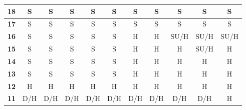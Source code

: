\documentclass[conference]{IEEEtran}
\begin{document}
\begin{table}[htbp]
\begin{tabular}{|c|c|c|c|c|c|c|c|c|c|c|}
\textbf{18} & \cellcolor[HTML]{32CB00}S & \cellcolor[HTML]{32CB00}S & \cellcolor[HTML]{32CB00}S & \cellcolor[HTML]{32CB00}S & \cellcolor[HTML]{32CB00}S & \cellcolor[HTML]{32CB00}S & \cellcolor[HTML]{32CB00}S & \cellcolor[HTML]{32CB00}S & \cellcolor[HTML]{32CB00}S & \cellcolor[HTML]{32CB00}S \\ \hline
\textbf{17} & \cellcolor[HTML]{32CB00}S & \cellcolor[HTML]{32CB00}S & \cellcolor[HTML]{32CB00}S & \cellcolor[HTML]{32CB00}S & \cellcolor[HTML]{32CB00}S & \cellcolor[HTML]{32CB00}S & \cellcolor[HTML]{32CB00}S & \cellcolor[HTML]{32CB00}S & \cellcolor[HTML]{32CB00}S & \cellcolor[HTML]{32CB00}S \\ \hline
\textbf{16} & \cellcolor[HTML]{32CB00}S & \cellcolor[HTML]{32CB00}S & \cellcolor[HTML]{32CB00}S & \cellcolor[HTML]{32CB00}S & \cellcolor[HTML]{32CB00}S & \cellcolor[HTML]{FE0000}H & \cellcolor[HTML]{FE0000}H & \cellcolor[HTML]{34CDF9}SU/H & \cellcolor[HTML]{34CDF9}SU/H & \cellcolor[HTML]{34CDF9}SU/H \\ \hline
\textbf{15} & \cellcolor[HTML]{32CB00}S & \cellcolor[HTML]{32CB00}S & \cellcolor[HTML]{32CB00}S & \cellcolor[HTML]{32CB00}S & \cellcolor[HTML]{32CB00}S & \cellcolor[HTML]{FE0000}H & \cellcolor[HTML]{FE0000}H & \cellcolor[HTML]{FE0000}H & \cellcolor[HTML]{34CDF9}SU/H & \cellcolor[HTML]{FE0000}H \\ \hline
\textbf{14} & \cellcolor[HTML]{32CB00}S & \cellcolor[HTML]{32CB00}S & \cellcolor[HTML]{32CB00}S & \cellcolor[HTML]{32CB00}S & \cellcolor[HTML]{32CB00}S & \cellcolor[HTML]{FE0000}H & \cellcolor[HTML]{FE0000}H & \cellcolor[HTML]{FE0000}H & \cellcolor[HTML]{FE0000}H & \cellcolor[HTML]{FE0000}H \\ \hline
\textbf{13} & \cellcolor[HTML]{32CB00}S & \cellcolor[HTML]{32CB00}S & \cellcolor[HTML]{32CB00}S & \cellcolor[HTML]{32CB00}S & \cellcolor[HTML]{32CB00}S & \cellcolor[HTML]{FE0000}H & \cellcolor[HTML]{FE0000}H & \cellcolor[HTML]{FE0000}H & \cellcolor[HTML]{FE0000}H & \cellcolor[HTML]{FE0000}H \\ \hline
\textbf{12} & \cellcolor[HTML]{FE0000}H & \cellcolor[HTML]{FE0000}H & \cellcolor[HTML]{FE0000}H & \cellcolor[HTML]{FE0000}H & \cellcolor[HTML]{FE0000}H & \cellcolor[HTML]{FE0000}H & \cellcolor[HTML]{FE0000}H & \cellcolor[HTML]{FE0000}H & \cellcolor[HTML]{FE0000}H & \cellcolor[HTML]{FE0000}H \\ \hline
\textbf{11} & \cellcolor[HTML]{FFC702}D/H & \cellcolor[HTML]{FFC702}D/H & \cellcolor[HTML]{FFC702}D/H & \cellcolor[HTML]{FFC702}D/H & \cellcolor[HTML]{FFC702}D/H & \cellcolor[HTML]{FFC702}D/H & \cellcolor[HTML]{FFC702}D/H & \cellcolor[HTML]{FFC702}D/H & \cellcolor[HTML]{FFC702}D/H & \cellcolor[HTML]{FE0000}H \\ \hline

\end{tabular}
\end{table}
\end{document}
